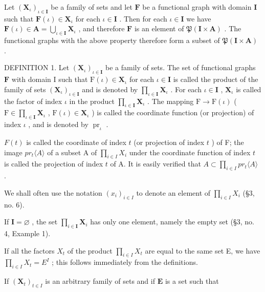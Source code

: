 Let \((\mathbf{X}_{\iota})_{\iota \in \mathbf{I}}\) be a family of sets and let \(\mathbf{F}\) be a functional graph with domain \(\mathbf{I}\) such that \(\mathbf{F}(\iota) \in \mathbf{X}_{\iota}\) for each \(\iota \in \mathbf{I}\) . Then for each \(\iota \in \mathbf{I}\) we have \(\mathbf{F}(\iota) \in \mathbf{A} = \bigcup_{\iota \in \mathbf{I}} \mathbf{X}_{\iota}\) , and therefore \(\mathbf{F}\) is an element of \(\mathfrak{P}(\mathbf{I} \times \mathbf{A})\) . The functional graphs with the above property therefore form a subset of \(\mathfrak{P}(\mathbf{I} \times \mathbf{A})\) .

DEFINITION 1. Let \((\mathbf{X}_{\iota})_{\iota \in \mathbf{I}}\) be a family of sets. The set of functional graphs \(\mathbf{F}\) with domain I such that \(\mathrm{F}(\iota) \in \mathbf{X}_{\iota}\) for each \(\iota \in \mathbf{I}\) is called the product of the family of sets \((\mathbf{X}_{\iota})_{\iota \in \mathbf{I}}\) and is denoted by \(\prod_{\iota \in \mathbf{I}} \mathbf{X}_{\iota}\) . For each \(\iota \in \mathbf{I}\) , \(\mathbf{X}_{\iota}\) is called the factor of index \(\iota\) in the product \(\prod_{\iota \in \mathbf{I}} \mathbf{X}_{\iota}\) . The mapping \(\mathrm{F} \to \mathrm{F}(\iota)\) ( \(\mathrm{F} \in \prod_{\iota \in \mathbf{I}} \mathbf{X}_{\iota}\) , \(\mathrm{F}(\iota) \in \mathbf{X}_{\iota}\) ) is called the coordinate function (or projection) of index \(\iota\) , and is denoted by \(\operatorname{pr}_{\iota}\) .

\(F(t)\) is called the coordinate of index \(t\) (or projection of index \(t\) ) of F; the image \(pr_{t}\langle A\rangle\) of a subset A of \(\prod_{i\in I}X_{i}\) under the coordinate function of index \(t\) is called the projection of index \(t\) of A. It is easily verified that \(A\subset\prod_{i\in I}pr_{t}\langle A\rangle\) .

We shall often use the notation \((x_{i})_{i\in I}\) to denote an element of \(\prod_{i\in I}X_{i}\) (§3, no. 6).

If \(\mathbf{I} = \varnothing\) , the set \(\prod_{i\in \mathbf{I}}\mathbf{X}_i\) has only one element, namely the empty set (§3, no. 4, Example 1).

If all the factors \(X_{t}\) of the product \(\prod_{i\in I}X_{t}\) are equal to the same set E, we have \(\prod_{i\in I}X_{t}=E^{I}\) ; this follows immediately from the definitions.

If \((\mathbf{X}_t)_{t\in I}\) is an arbitrary family of sets and if \(\mathbf{E}\) is a set such that


